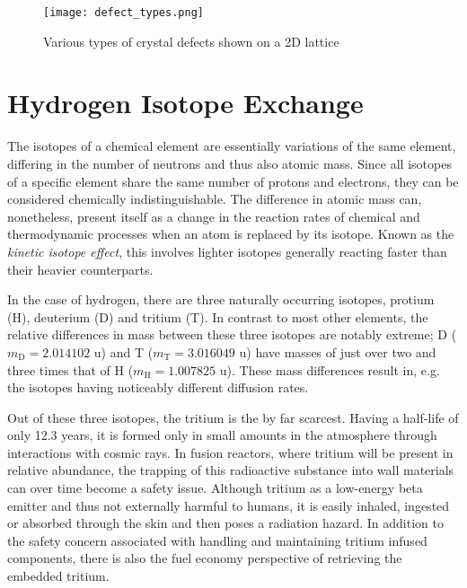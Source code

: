 \begin{figure}[!ht]
\center
\texttt{[image: defect\_types.png]}
\caption{Various types of crystal defects shown on a 2D lattice}
\label{Fig:defect_types}
\end{figure}


\section{Hydrogen Isotope Exchange}

The isotopes of a chemical element are essentially variations of the same element, differing in the number of neutrons and thus also atomic mass. 
Since all isotopes of a specific element share the same number of protons and electrons, they can be considered chemically indistinguishable. 
The difference in atomic mass can, nonetheless, present itself as a change in the reaction rates of chemical and thermodynamic processes when an atom is replaced by its isotope. 
Known as the \textit{kinetic isotope effect}, this involves lighter isotopes generally reacting faster than their heavier counterparts. \cite{atkins2006atkins}

In the case of hydrogen, there are three naturally occurring isotopes, protium (H), deuterium (D) and tritium (T). 
In contrast to most other elements, the relative differences in mass between these three isotopes are notably extreme; D ($m_{\text{D}}=2.014102$ u) and T ($m_{\text{T}}=3.016049$ u) have masses of just over two and three times that of H ($m_{\text{H}}=1.007825$ u). 
These mass differences result in, e.g. the isotopes having noticeably different diffusion rates.

Out of these three isotopes, the tritium is the by far scarcest. 
Having a half-life of only 12.3 years, it is formed only in small amounts in the atmosphere through interactions with cosmic rays.
In fusion reactors, where tritium will be present in relative abundance, the trapping of this radioactive substance into wall materials can over time become a safety issue. 
Although tritium as a low-energy beta emitter and thus not externally harmful to humans, it is easily inhaled, ingested or absorbed through the skin and then poses a radiation hazard. \cite{tritiumHealth}
In addition to the safety concern associated with handling and maintaining tritium infused components, there is also the fuel economy perspective of retrieving the embedded tritium.

